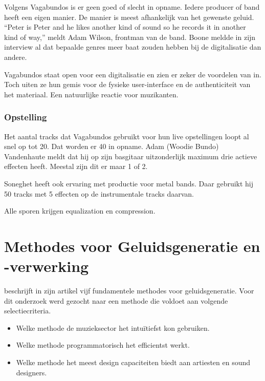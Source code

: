 Volgens Vagabundos is er geen goed of slecht in opname. Iedere producer of band heeft een eigen manier. De manier is meest afhankelijk van het gewenste geluid. ``Peter is Peter and he likes another kind of sound so he records it in another kind of way,'' meldt Adam Wilson, frontman van de band. \autocite{vagabundos} Boone meldde in zijn interview al dat bepaalde genres meer baat zouden hebben bij de digitalisatie dan andere.  \autocite{peterboone}

Vagabundos staat open voor een digitalisatie en zien er zeker de voordelen van in. Toch uiten ze hun gemis voor de fysieke user-interface en de authenticiteit van het materiaal. Een natuurlijke reactie voor muzikanten. \autocite{vagabundos}

\subsubsection*{Opstelling}

Het aantal tracks dat Vagabundos gebruikt voor hun live opstellingen loopt al snel op tot 20. Dat worden er 40 in opname. Adam (Woodie Bundo) Vandenhaute meldt dat hij op zijn basgitaar uitzonderlijk maximum drie actieve effecten heeft. Meestal zijn dit er maar 1 of 2. \autocite{vagabundos}

Soneghet heeft ook ervaring met productie voor metal bands. Daar gebruikt hij 50 tracks met 5 effecten op de instrumentale tracks daarvan. \autocite{vagabundos}

Alle sporen krijgen equalization en compression. \autocite{vagabundos}

\section{Methodes voor Geluidsgeneratie en -verwerking}
\label{sec:methodesgeneratie}

\textcite{methodes} beschrijft in zijn artikel vijf fundamentele methodes voor geluidsgeneratie. Voor dit onderzoek werd gezocht naar een methode die voldoet aan volgende selectiecriteria.

\begin{itemize}
    \item Welke methode de muzieksector het intuïtiefst kon gebruiken.
    \item Welke methode programmatorisch het efficientst werkt.
    \item Welke methode het meest design capaciteiten biedt aan artiesten en sound designers.
\end{itemize}{}

